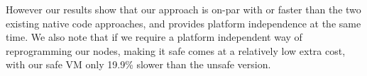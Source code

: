 However our results show that our approach is on-par with or faster than the two existing native code approaches, and provides platform independence at the same time. We also note that if we require a platform independent way of reprogramming our nodes, making it safe comes at a relatively low extra cost, with our safe VM only 19.9\% slower than the unsafe version.


